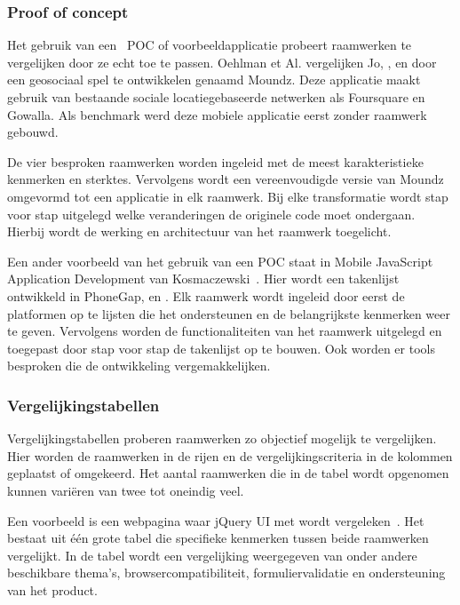 \subsubsection{Proof of concept}
\label{sec:manier-poc}
Het gebruik van een ~POC of voorbeeldapplicatie probeert raamwerken te vergelijken door ze echt toe te passen.
Oehlman et Al. vergelijken Jo, \jqt{},  \jqm{} en \st{} door een geosociaal spel te ontwikkelen genaamd Moundz. 
Deze applicatie maakt gebruik van bestaande sociale locatiegebaseerde netwerken als Foursquare en Gowalla.
Als benchmark werd deze mobiele applicatie eerst zonder raamwerk gebouwd.

De vier besproken raamwerken worden ingeleid met de meest karakteristieke kenmerken en sterktes.
Vervolgens wordt een vereenvoudigde versie van Moundz omgevormd tot een applicatie in elk raamwerk.
Bij elke transformatie wordt stap voor stap uitgelegd welke veranderingen de originele code moet ondergaan.
Hierbij wordt de werking en architectuur van het raamwerk toegelicht.

Een ander voorbeeld van het gebruik van een POC staat in Mobile JavaScript Application Development van Kosmaczewski~\cite{Kosmaczewski2012}.
Hier wordt een takenlijst ontwikkeld in PhoneGap, \st{} en \jqm{}.
Elk raamwerk wordt ingeleid door eerst de platformen op te lijsten die het ondersteunen en de belangrijkste kenmerken weer te geven.
Vervolgens worden de functionaliteiten van het raamwerk uitgelegd en toegepast door stap voor stap de takenlijst op te bouwen.
Ook worden er tools besproken die de ontwikkeling vergemakkelijken.

\subsubsection{Vergelijkingstabellen}
\label{sec:manier-vergelijkingstabellen}
Vergelijkingstabellen proberen raamwerken zo objectief mogelijk te vergelijken.
Hier worden de raamwerken in de rijen en de vergelijkingscriteria in de kolommen geplaatst of omgekeerd.
Het aantal raamwerken die in de tabel wordt opgenomen kunnen variëren van twee tot oneindig veel.

Een voorbeeld is een webpagina waar jQuery UI met \kendo{} wordt vergeleken~\cite{Bristowe2012}.
Het bestaat uit één grote tabel die specifieke kenmerken tussen beide raamwerken vergelijkt.
In de tabel wordt een vergelijking weergegeven van onder andere beschikbare thema's,  browsercompatibiliteit,  formuliervalidatie en  ondersteuning van het product.

